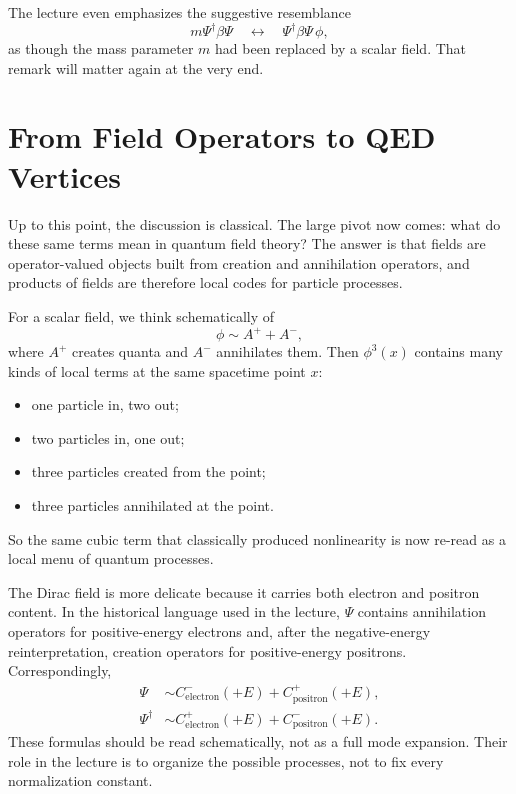The lecture even emphasizes the suggestive resemblance
\begin{equation}
m\Psi^\dagger\beta\Psi
\quad \longleftrightarrow \quad
\Psi^\dagger\beta\Psi\,\phi,
\end{equation}
as though the mass parameter \(m\) had been replaced by a scalar field. That remark will matter again at the very end.

\section{From Field Operators to QED Vertices}

Up to this point, the discussion is classical. The large pivot now comes: what do these same terms mean in quantum field theory? The answer is that fields are operator-valued objects built from creation and annihilation operators, and products of fields are therefore local codes for particle processes.

For a scalar field, we think schematically of
\begin{equation}
\phi \sim A^+ + A^-,
\end{equation}
where \(A^+\) creates quanta and \(A^-\) annihilates them. Then \(\phi^3(x)\) contains many kinds of local terms at the same spacetime point \(x\):
\begin{itemize}
\item one particle in, two out;
\item two particles in, one out;
\item three particles created from the point;
\item three particles annihilated at the point.
\end{itemize}
So the same cubic term that classically produced nonlinearity is now re-read as a local menu of quantum processes.

The Dirac field is more delicate because it carries both electron and positron content. In the historical language used in the lecture, \(\Psi\) contains annihilation operators for positive-energy electrons and, after the negative-energy reinterpretation, creation operators for positive-energy positrons. Correspondingly,
\begin{align}
\Psi &\sim C^-_{\text{electron}}(+E)+C^+_{\text{positron}}(+E),
\\
\Psi^\dagger &\sim C^+_{\text{electron}}(+E)+C^-_{\text{positron}}(+E).
\end{align}
These formulas should be read schematically, not as a full mode expansion. Their role in the lecture is to organize the possible processes, not to fix every normalization constant.

